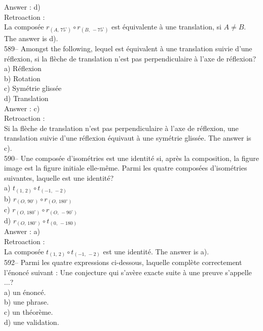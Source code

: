 ﻿\documentclass[letterpaper, 12pt]{article}
\begin{document}
Answer : d)\\

Retroaction : \\
La compos\'ee $r_{\left(A,\,75^{\circ}\right)} \circ
r_{\left(B,\,-75^{\circ}\right) }$ est \'equivalente \`a une translation, si
$A\neq B$.  The answer is d).\\

589-- Amongst the following, lequel est \'equivalent \`a une
translation suivie d'une r\'eflexion, si la fl\`eche de translation n'est
pas perpendiculaire \`a l'axe de r\'eflexion?\\
a) R\'eflexion\\
b) Rotation\\
c) Sym\'etrie gliss\'ee\\
d) Translation\\

Answer : c)\\

Retroaction : \\
Si la fl\`eche de translation n'est pas perpendiculaire \`a l'axe de
r\'eflexion, une translation suivie d'une r\'eflexion  \'equivaut \`a une
sym\'etrie gliss\'ee.  The answer is c).\\

590-- Une compos\'ee d'isom\'etries est une identit\'e si, apr\`es la
composition, la figure image est la figure initiale elle-m\^eme.  Parmi les
quatre compos\'ees d'isom\'etries suivantes, laquelle est une identit\'e?\\
a) $t_{\left(1,\,2\right) } \circ t_{\left(-1,\,-2\right) } $\\
b) $r_{\left(O,\,90^{\circ}\right)} \circ r_{\left(O,\,180^{\circ}\right)}
$\\
c) $r_{\left(O,\,180^{\circ}\right)} \circ r_{\left(O,\,-90^{\circ}\right)}
$\\
d) $r_{\left(O,\,180^{\circ}\right)} \circ t_{\left(0,\,-180\right)} $   \\

Answer : a) \\

Retroaction : \\
La compos\'ee $t_{\left(1,\,2\right) } \circ t_{\left(-1,\,-2\right) } $ est
une identit\'e.  The answer is a).\\


592--  Parmi les quatre expressions ci-dessous, laquelle compl\`ete
correctement l'\'enonc\'e suivant : \og Une conjecture qui s'av\`ere
exacte suite \`a une preuve s'appelle $\dots$\fg ?\\
a) un \'enonc\'e.\\
b) une phrase. \\
c) un th\'eor\`eme.\\
d) une validation.\\
\end{document}
